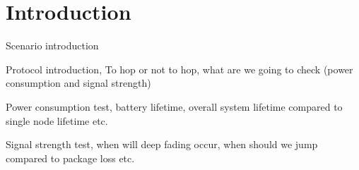 \chapter{Introduction}

Scenario introduction

Protocol introduction, To hop or not to hop, what are we going to check (power consumption and signal strength)

Power consumption test, battery lifetime, overall system lifetime compared to single node lifetime etc.

Signal strength test, when will deep fading occur, when should we jump compared to package loss etc.
